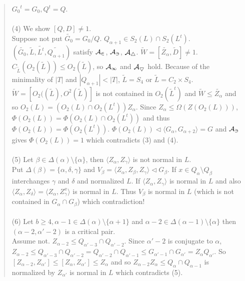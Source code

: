 \begin{quote}
${G_0}^t=G_0, Q^t=Q$.  \\
\\
(4) We show $[Q, D] \ne 1$.\\
Suppose not put ${\tilde {G_0}} = G_0/Q$.
$Q_{\alpha + 1} \in S_2(L) \cap S_2(L^t)$.
$({\tilde {G_0}}, {\tilde L}, {\tilde {L^t}}, {\tilde {Q_{\alpha + 1}}})$ satisfy ${\cal {A_2}}$, ${\cal {A_3}}$, ${\cal {A_4}}$.
${\tilde W}= [{\tilde {Z_{\alpha}}}, {\tilde D}] \ne 1$.
$C_{\tilde L}(O_2({\tilde L})) \leq O_2({\tilde L})$, so  ${\cal {A_1}}$ and ${\cal {A_5}}$ hold.
Because of the minimality of $|T|$ and $|Q_{\alpha + 1}| < |T|$, ${\tilde L} = S_4$ or ${\tilde L} = C_2 \times S_4$.
${\tilde W} = [O_2(({\tilde L}), O^2({\tilde L})]$ is not contained in $O_2({\tilde L}^t)$ and ${\tilde W} \leq {\tilde {Z_{\alpha}}}$
and so $O_2(L) =(O_2(L) \cap O_2(L^t))Z_{\alpha}$.
Since $Z_{\alpha} \leq \Omega(Z(O_2(L)))$, $\Phi(O_2(L))= \Phi(O_2(L) \cap O_2(L^t))$ and thus
$\Phi(O_2(L)) = \Phi(O_2(L^t))$. $\Phi(O_2(L)) \lhd \langle G_{\alpha}, G_{\alpha + 2} \rangle = G$ and ${\cal {A_3}}$ gives
$\Phi(O_2(L))=1$ which contradicts (3) and (4).\\
\\
(5) Let $\beta \in \Delta(\alpha) \setminus \{\alpha \}$, then $\langle Z_{\alpha}, Z_{\gamma} \rangle$ is not normal in $L$.
\\
Put $\Delta(\beta) = \{ \alpha, \delta, \gamma \}$ and $V_{\beta}= \langle Z_{\alpha}, Z_{\beta}, Z_{\gamma} \rangle \lhd G_{\beta}$.
If $x \in Q_{\alpha} \setminus Q_{\beta}$ interchanges $\gamma$ and $\delta$ and normalized $L$.
If $\langle Z_{\alpha} , Z_{\gamma} \rangle$ is normal in $L$ and also 
$\langle Z_{\alpha}, Z_{\delta} \rangle = \langle Z_{\alpha}, Z_{\gamma}^x \rangle$ is normal in $L$.  Thus $V_{\beta}$ is normal
in $L$ (which is not contained in $G_{\alpha} \cap G_{\beta}$) which contradiction!\\
\\
(6) Let $b \geq 4, \alpha - 1 \in \Delta(\alpha) \setminus \{ \alpha + 1 \}$ and
$\alpha - 2 \in \Delta(\alpha - 1) \setminus \{\alpha \}$ then $(\alpha - 2, \alpha' - 2)$ is a critical pair.
\\
Assume not.  $Z_{\alpha - 2} \leq Q_{\alpha' - 3} \cap Q_{\alpha' - 2}$.  Since
$\alpha' - 2$ is conjugate to $\alpha$,
$Z_{\alpha -2} \leq Q_{\alpha' -3} \cap Q_{\alpha' - 2} = Q_{\alpha' - 2} \cap Q_{\alpha' - 1} \leq
G_{\alpha' - 1} \cap G_{\alpha'} = Z_{\alpha}Q_{\alpha'}$.  So
$[Z_{\alpha - 2}, Z_{\alpha'}] \leq [Z_{\alpha}, Z_{\alpha'}] \leq Z_{\alpha}$ and so $Z_{\alpha - 2} Z_{\alpha} \leq Q_{\alpha} \cap Q_{\alpha - 1}$ is normalized by $Z_{\alpha'}$ is normal in $L$ which contradicts (5).\\

\end{quote}
